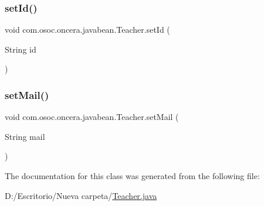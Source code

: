 \subsubsection{\texorpdfstring{setId()}{setId()}}
{\footnotesize\ttfamily void com.\+osoc.\+oncera.\+javabean.\+Teacher.\+set\+Id (\begin{DoxyParamCaption}\item[{String}]{id }\end{DoxyParamCaption})}

\mbox{\label{classcom_1_1osoc_1_1oncera_1_1javabean_1_1_teacher_aa2304cc6cc27ec32b9494e439de014c8}} 
\subsubsection{\texorpdfstring{setMail()}{setMail()}}
{\footnotesize\ttfamily void com.\+osoc.\+oncera.\+javabean.\+Teacher.\+set\+Mail (\begin{DoxyParamCaption}\item[{String}]{mail }\end{DoxyParamCaption})}



The documentation for this class was generated from the following file\+:\begin{DoxyCompactItemize}
\item 
D\+:/\+Escritorio/\+Nueva carpeta/\mbox{\hyperlink{_teacher_8java}{Teacher.\+java}}\end{DoxyCompactItemize}
